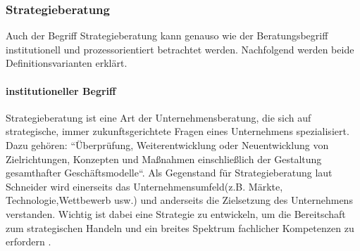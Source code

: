 
\subsubsection*{Strategieberatung}
Auch der Begriff Strategieberatung kann genauso wie der Beratungsbegriff institutionell und prozessorientiert betrachtet werden.
Nachfolgend werden beide Definitionsvarianten erklärt. 
\paragraph*{institutioneller Begriff}

 Strategieberatung ist eine Art der Unternehmensberatung, die sich auf strategische, immer zukunftsgerichtete Fragen eines Unternehmens spezialisiert. Dazu gehören: ``Überprüfung, Weiterentwicklung oder Neuentwicklung von Zielrichtungen, Konzepten und Maßnahmen einschließlich der Gestaltung gesamthafter Geschäftsmodelle``\cite [424]{ReinekeBock200709}. Als Gegenstand für Strategieberatung laut Schneider wird einerseits das Unternehmensumfeld(z.B. Märkte, Technologie,Wettbewerb usw.) und anderseits die Zielsetzung des Unternehmens verstanden. Wichtig ist dabei eine Strategie zu entwickeln, um die Bereitschaft zum strategischen Handeln und ein breites Spektrum fachlicher Kompetenzen zu erfordern \cite [424]{ReinekeBock200709}.

